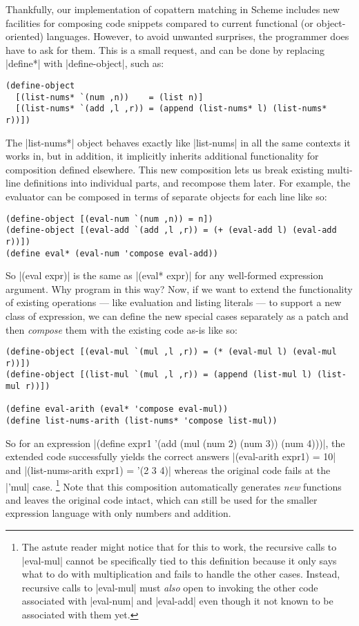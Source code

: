 Thankfully, our implementation of copattern matching in Scheme includes new facilities for composing code snippets compared to current functional (or object-oriented) languages.
However, to avoid unwanted surprises, the programmer does have to ask for them.
This is a small request, and can be done by replacing \scm|define*| with \scm|define-object|, such as:
\begin{verbatim}
(define-object
  [(list-nums* `(num ,n))    = (list n)]
  [(list-nums* `(add ,l ,r)) = (append (list-nums* l) (list-nums* r))])
\end{verbatim}
The \scm|list-nums*| object behaves exactly like \scm|list-nums| in all the same contexts it works in, but in addition, it implicitly inherits additional functionality for composition defined elsewhere.
This new composition lets us break existing multi-line definitions into individual parts, and recompose them later.
For example, the evaluator can be composed in terms of separate objects for each line like so:
\begin{verbatim}
(define-object [(eval-num `(num ,n)) = n])
(define-object [(eval-add `(add ,l ,r)) = (+ (eval-add l) (eval-add r))])
(define eval* (eval-num 'compose eval-add))
\end{verbatim}
So \scm|(eval expr)| is the same as \scm|(eval* expr)| for any well-formed expression argument.
Why program in this way?
Now, if we want to extend the functionality of existing operations --- like evaluation and listing literals --- to support a new class of expression, we can define the new special cases separately as a patch and then \emph{compose} them with the existing code as-is like so:
\begin{verbatim}
(define-object [(eval-mul `(mul ,l ,r)) = (* (eval-mul l) (eval-mul r))])
(define-object [(list-mul `(mul ,l ,r)) = (append (list-mul l) (list-mul r))])

(define eval-arith (eval* 'compose eval-mul))
(define list-nums-arith (list-nums* 'compose list-mul))
\end{verbatim}
So for an expression \scm|(define expr1 '(add (mul (num 2) (num 3)) (num 4)))|, the extended code successfully yields the correct answers \scm|(eval-arith expr1) = 10| and \scm|(list-nums-arith expr1) = '(2 3 4)| whereas the original code fails at the \scm|'mul| case.%
\footnote{
  The astute reader might notice that for this to work, the recursive calls to \scm|eval-mul| cannot be specifically tied to this definition because it only says what to do with multiplication and fails to handle the other cases.
  Instead, recursive calls to \scm|eval-mul| must \emph{also} open to invoking the other code associated with \scm|eval-num| and \scm|eval-add| even though it not known to be associated with them yet.}
%
Note that this composition automatically generates \emph{new} functions and leaves the original code intact, which can still be used for the smaller expression language with only numbers and addition.

